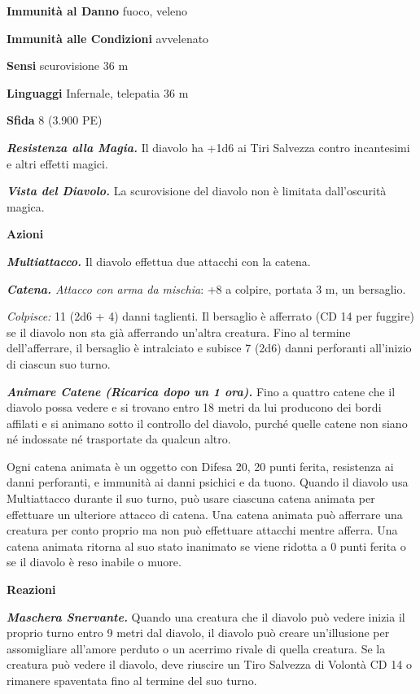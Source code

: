 \begin{multicols}{2}
\textbf{Immunità al Danno} fuoco, veleno 

\textbf{Immunità alle Condizioni} avvelenato

\textbf{Sensi} scurovisione 36 m

\textbf{Linguaggi} Infernale, telepatia 36 m 

\textbf{Sfida} 8 (3.900 PE)

\emph{\textbf{Resistenza alla Magia.}} Il diavolo ha +1d6 ai Tiri Salvezza contro incantesimi e altri effetti magici.

\emph{\textbf{Vista del Diavolo.}} La scurovisione del diavolo non è limitata dall'oscurità magica.

\textbf{Azioni}

\emph{\textbf{Multiattacco.}} Il diavolo effettua due attacchi con la catena.

\emph{\textbf{Catena.} Attacco con arma da mischia}: +8 a colpire, portata 3 m, un bersaglio.

\emph{Colpisce:} 11 (2d6 + 4) danni taglienti. Il bersaglio è afferrato (CD 14 per fuggire) se il diavolo non sta già afferrando un'altra creatura. Fino al termine dell'afferrare, il bersaglio è intralciato e subisce 7 (2d6) danni perforanti all'inizio di ciascun suo turno.

\emph{\textbf{Animare Catene (Ricarica dopo un 1 ora).}} Fino a quattro catene che il diavolo possa vedere e si trovano entro 18 metri da lui producono dei bordi affilati e si animano sotto il controllo del diavolo, purché quelle catene non siano né indossate né trasportate da qualcun altro.

Ogni catena animata è un oggetto con Difesa 20, 20 punti ferita, resistenza ai danni perforanti, e immunità ai danni psichici e da tuono. Quando il diavolo usa Multiattacco durante il suo turno, può usare ciascuna catena animata per effettuare un ulteriore attacco di catena. Una catena animata può afferrare una creatura per conto proprio ma non può effettuare attacchi mentre afferra. Una catena animata ritorna al suo stato inanimato se viene ridotta a 0 punti ferita o se il diavolo è reso inabile o muore.

\textbf{Reazioni}

\emph{\textbf{Maschera Snervante.}} Quando una creatura che il diavolo può vedere inizia il proprio turno entro 9 metri dal diavolo, il diavolo può creare un'illusione per assomigliare all'amore perduto o un acerrimo rivale di quella creatura. Se la creatura può vedere il diavolo, deve riuscire un Tiro Salvezza di Volontà CD 14 o rimanere spaventata fino al termine del suo turno.


\end{multicols}
